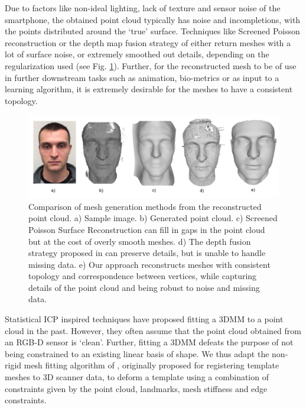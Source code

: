 \documentclass[10pt,twocolumn,letterpaper]{article}
\begin{document}
Due to factors like non-ideal lighting, lack of texture and sensor noise of the smartphone, the obtained point cloud typically has noise and incompletions, with the points distributed around the `true' surface.
 Techniques like Screened Poisson reconstruction or the depth map fusion strategy of \cite{hernandez2015near} either return meshes with a lot of surface noise, or extremely smoothed out details, depending on the regularization used (see Fig. \ref{fig:mesh_comp}). Further, for the reconstructed mesh to be of use in further downstream tasks such as animation, bio-metrics or as input to a learning algorithm, it is extremely desirable for the meshes to have a consistent topology. \\
 \begin{figure}[t]
\begin{center}
   \includegraphics[width=0.95\linewidth]{images/meshing_compare.png}
\end{center}
   \caption{Comparison of mesh generation methods from the reconstructed point cloud. a) Sample image. b) Generated point cloud. c) Screened Poisson Surface Reconstruction \cite{kazhdan2013screened} can fill in gaps in the point cloud but at the cost of overly smooth meshes. d) The depth fusion strategy proposed in \cite{hernandez2015near} can preserve details, but is unable to handle missing data. e) Our approach reconstructs meshes with consistent topology and correspondence between vertices, while capturing details of the point cloud and being robust to noise and missing data. }
\label{fig:mesh_comp}
\end{figure}

 Statistical ICP inspired techniques have proposed fitting a 3DMM to a point cloud \cite{schneider2009fitting,bazik2017robust,blanz2004statistical} in the past. However, they often assume that the point cloud obtained from an RGB-D sensor is `clean'. Further, fitting a 3DMM defeats the purpose of not being constrained to an existing linear basis of shape.
 We thus adapt the non-rigid mesh fitting algorithm of \cite{amberg2007optimal}, originally proposed for registering template meshes to 3D scanner data, to deform a template using a combination of constraints given by the point cloud, landmarks, mesh stiffness and edge constraints. 
 
\end{document}
